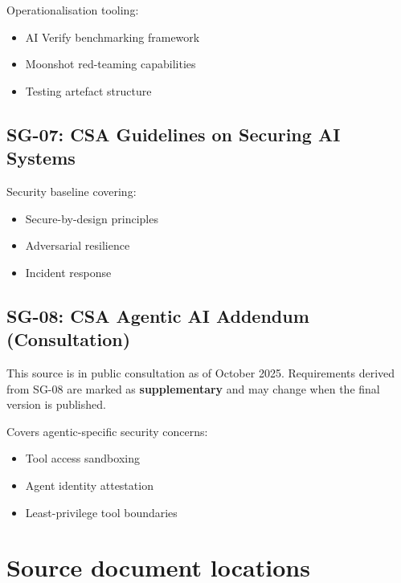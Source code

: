 Operationalisation tooling:

\begin{itemize}
  \item AI Verify benchmarking framework
  \item Moonshot red-teaming capabilities
  \item Testing artefact structure
\end{itemize}

\subsection{SG-07: CSA Guidelines on Securing AI Systems}

Security baseline covering:

\begin{itemize}
  \item Secure-by-design principles
  \item Adversarial resilience
  \item Incident response
\end{itemize}

\subsection{SG-08: CSA Agentic AI Addendum (Consultation)}

\begin{tcolorbox}[colback=sgamber!10,colframe=sgamber!70,title=\faIcon{exclamation-triangle} Consultation-Stage Document]
This source is in public consultation as of October 2025. Requirements derived
from SG-08 are marked as \textbf{supplementary} and may change when the final
version is published.
\end{tcolorbox}

Covers agentic-specific security concerns:

\begin{itemize}
  \item Tool access sandboxing
  \item Agent identity attestation
  \item Least-privilege tool boundaries
\end{itemize}

\section{Source document locations}


